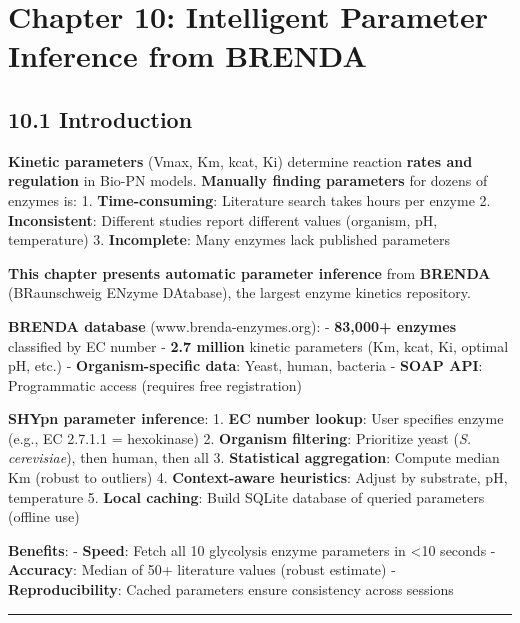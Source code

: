 \hypertarget{chapter-10-intelligent-parameter-inference-from-brenda}{%
\chapter{Chapter 10: Intelligent Parameter Inference from
BRENDA}\label{chapter-10-intelligent-parameter-inference-from-brenda}}

\hypertarget{introduction}{%
\section{10.1 Introduction}\label{introduction}}

\textbf{Kinetic parameters} (Vmax, Km, kcat, Ki) determine reaction
\textbf{rates and regulation} in Bio-PN models. \textbf{Manually finding
parameters} for dozens of enzymes is: 1. \textbf{Time-consuming}:
Literature search takes hours per enzyme 2. \textbf{Inconsistent}:
Different studies report different values (organism, pH, temperature) 3.
\textbf{Incomplete}: Many enzymes lack published parameters

\textbf{This chapter presents automatic parameter inference} from
\textbf{BRENDA} (BRaunschweig ENzyme DAtabase), the largest enzyme
kinetics repository.

\textbf{BRENDA database} (www.brenda-enzymes.org): - \textbf{83,000+
enzymes} classified by EC number - \textbf{2.7 million} kinetic
parameters (Km, kcat, Ki, optimal pH, etc.) - \textbf{Organism-specific
data}: Yeast, human, bacteria - \textbf{SOAP API}: Programmatic access
(requires free registration)

\textbf{SHYpn parameter inference}: 1. \textbf{EC number lookup}: User
specifies enzyme (e.g., EC 2.7.1.1 = hexokinase) 2. \textbf{Organism
filtering}: Prioritize yeast (\emph{S. cerevisiae}), then human, then
all 3. \textbf{Statistical aggregation}: Compute median Km (robust to
outliers) 4. \textbf{Context-aware heuristics}: Adjust by substrate, pH,
temperature 5. \textbf{Local caching}: Build SQLite database of queried
parameters (offline use)

\textbf{Benefits}: - \textbf{Speed}: Fetch all 10 glycolysis enzyme
parameters in \textless10 seconds - \textbf{Accuracy}: Median of 50+
literature values (robust estimate) - \textbf{Reproducibility}: Cached
parameters ensure consistency across sessions

\begin{center}\rule{0.5\linewidth}{0.5pt}\end{center}

